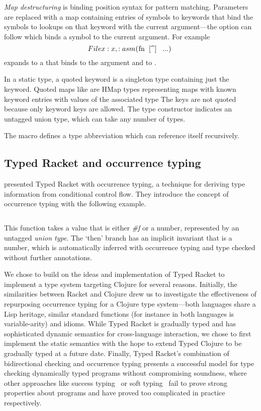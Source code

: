 \emph{Map destructuring} is binding position syntax for pattern matching.
Parameters are replaced with a map containing entries of symbols to keywords that bind the symbols
to lookups on that keyword with the current argument---the  option
can follow which binds a symbol to the current argument. For example
$$
\clj{(fn [{^File x :x, :as m}] ...)}
$$ 
expands to a  that binds  to the argument and 
 to .

In a static type, a quoted keyword  is a singleton type containing just the keyword.
Quoted maps like  are HMap types representing
maps with known keyword entries with values of the associated type
The keys are not quoted because only keyword keys
are allowed. The type constructor  indicates an untagged union type, which can take
any number of types.

The  macro defines a type abbreviation which can reference itself recursively.

\subsection{Typed Racket and occurrence typing}

\citet{TF10}
presented Typed Racket with occurrence typing,
a technique for deriving type information from conditional control flow.
They introduce the concept of occurrence typing 
with the following example.

\inputminted[firstline=1]{racket}{code/tr/example1.rkt}

This function takes a value that is either \emph{\#f} %
or a number, represented by an untagged \emph{union type}.
The `then' branch has an implicit invariant
that  is a number, which is automatically inferred with occurrence typing
and type checked without further annotations.

We chose to build on the ideas and implementation
of Typed Racket to implement a type system targeting Clojure for several reasons.
Initially, the similarities between Racket and Clojure drew us to
investigate the effectiveness of repurposing occurrence typing
for a Clojure type system---both languages share a Lisp heritage,
similar standard functions 
(for instance 
in both languages is variable-arity)
and idioms.
While Typed Racket is gradually typed and has sophisticated
dynamic semantics for cross-language interaction, we 
chose to first implement
the static semantics
with the hope to extend Typed Clojure to be gradually typed at a future date.
Finally,
Typed Racket's combination of bidirectional checking
and occurrence typing presents a successful model for 
type checking dynamically typed programs without compromising
soundness, where other approaches like success typing~\cite{todo-dialyzer-paper}
or soft typing~\cite{successtyping-todo}
fail to prove strong properties about programs
and have proved too complicated in practice respectively.

